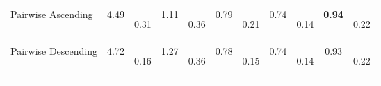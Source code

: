 \begin{tabular}{  l  c  c  c  c  c  c  c  c  c  c }
Pairwise Ascending & 4.49  & 0.31 \begin{tiny}[0.28, 0.44]\end{tiny} & 1.11  & 0.36 \begin{tiny}[0.33, 0.45]\end{tiny} & 0.79  & 0.21 \begin{tiny}[0.10, 0.31]\end{tiny} & 0.74  & 0.14 \begin{tiny}[0.08, 0.22]\end{tiny} & \textbf{0.94}  & 0.22 \begin{tiny}[0.16, 0.34]\end{tiny} \\
Pairwise Descending & 4.72  & 0.16 \begin{tiny}[0.14, 0.22]\end{tiny} & 1.27  & 0.36 \begin{tiny}[0.32, 0.53]\end{tiny} & 0.78  & 0.15 \begin{tiny}[0.10, 0.23]\end{tiny} & 0.74  & 0.14 \begin{tiny}[0.08, 0.25]\end{tiny} & 0.93  & 0.22 \begin{tiny}[0.17, 0.33]\end{tiny} \\
\hline
\end{tabular}
